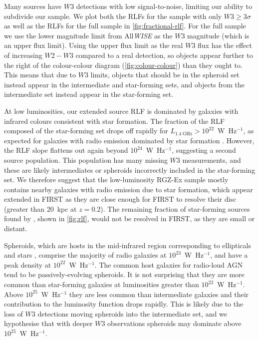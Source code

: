       Many sources have $W3$ detections with low signal-to-noise, limiting our ability to subdivide our sample. We plot both the RLFs for the sample with only $W3 \geq 3 \sigma$ as well as the RLFs for the full sample in \autoref{fig:fractional-rlf}. For the full sample we use the lower magnitude limit from All\emph{WISE} as the $W3$ magnitude (which is an upper flux limit). Using the upper flux limit as the real $W3$ flux has the effect of increasing $W2 - W3$ compared to a real detection, so objects appear further to the right of the colour-colour diagram (\autoref{fig:colour-colour}) than they ought to. This means that due to $W3$ limits, objects that should be in the spheroid set instead appear in the intermediate and star-forming sets, and objects from the intermediate set instead appear in the star-forming set.

      At low luminosities, our extended source RLF is dominated by galaxies with infrared
      colours consistent with star formation. The fraction
      of the RLF composed of the star-forming set drops off rapidly for
      $L_{1.4\ \mathrm{GHz}} > 10^{22}$~W~Hz$^{-1}$, as expected for galaxies with radio emission
      dominated by star formation \citep[e.g.][]{mauch07rlf}. However, the RLF slope flattens out again beyond $10^{24}$~W~Hz$^{-1}$, suggesting a second source population. This population has many missing $W3$ measurements, and these are likely intermediates or spheroids incorrectly included in the star-forming set. We therefore suggest that the
      low-luminosity RGZ-Ex sample mostly contains nearby galaxies with radio
      emission due to star formation, which appear extended in FIRST as they
      are close enough for FIRST to resolve their
      disc (greater than 20~kpc at $z = 0.2$). The remaining fraction of star-forming sources found by
      \citet{mauch07rlf}, shown in
      \autoref{fig:rlf}, would not be resolved in FIRST, as they are small or
      distant.

      Spheroids, which are hosts in the mid-infrared region corresponding to ellipticals and stars \citep{wright10wise}, comprise the majority of radio galaxies at $10^{23}$~W~Hz$^{-1}$,
      and have a peak density at $10^{22}$~W~Hz$^{-1}$. The common host galaxies for radio-loud AGN tend to be passively-evolving spheroids. It is not surprising that they are more common than star-forming galaxies at luminosities greater than $10^{22}$~W~Hz$^{-1}$. Above
      $10^{25}$~W~Hz$^{-1}$ they are less common than intermediate galaxies and
      their contribution to the luminosity function drops rapidly. This is likely due to the loss of $W3$ detections moving spheroids into the intermediate set, and we hypothesise that with deeper $W3$ observations spheroids may dominate above $10^{25}$~W~Hz$^{-1}$.

